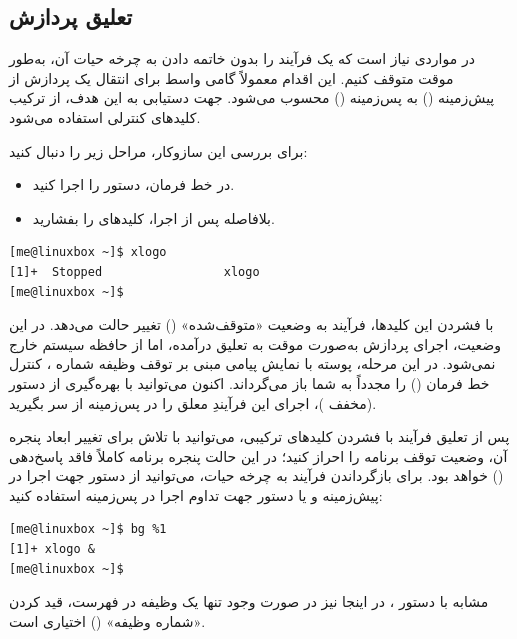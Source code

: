 \subsection{تعلیق پردازش}

در مواردی نیاز است که یک فرآیند را بدون خاتمه دادن به چرخه حیات آن، به‌طور موقت متوقف کنیم. این اقدام معمولاً گامی واسط برای انتقال یک پردازش از پیش‌زمینه () به پس‌زمینه () محسوب می‌شود. جهت دستیابی به این هدف، از ترکیب کلیدهای کنترلی  استفاده می‌شود.

برای بررسی این سازوکار، مراحل زیر را دنبال کنید:

\begin{itemize}
  \item در خط فرمان، دستور  را اجرا کنید.
  \item بلافاصله پس از اجرا، کلیدهای  را بفشارید.
\end{itemize}

\begin{latin}
\begin{lstlisting}
[me@linuxbox ~]$ xlogo
[1]+  Stopped                 xlogo
[me@linuxbox ~]$
\end{lstlisting}
\end{latin}

با فشردن این کلیدها، فرآیند  به وضعیت «متوقف‌شده» () تغییر حالت می‌دهد. در این وضعیت، اجرای پردازش به‌صورت موقت به تعلیق درآمده، اما از حافظه سیستم خارج نمی‌شود. در این مرحله، پوسته با نمایش پیامی مبنی بر توقف وظیفه شماره \cmd{[1]}، کنترل خط فرمان () را مجدداً به شما باز می‌گرداند. اکنون می‌توانید با بهره‌گیری از دستور  (مخفف )، اجرای این فرآیندِ معلق را در پس‌زمینه از سر بگیرید.

پس از تعلیق فرآیند  با فشردن کلیدهای ترکیبی، می‌توانید با تلاش برای تغییر ابعاد پنجره آن، وضعیت توقف برنامه را احراز کنید؛ در این حالت پنجره برنامه کاملاً فاقد پاسخ‌دهی () خواهد بود. برای بازگرداندن فرآیند به چرخه حیات، می‌توانید از دستور  جهت اجرا در پیش‌زمینه و یا دستور  جهت تداوم اجرا در پس‌زمینه استفاده کنید:

\begin{latin}
\begin{lstlisting}
[me@linuxbox ~]$ bg %1
[1]+ xlogo &
[me@linuxbox ~]$
\end{lstlisting}
\end{latin}

مشابه با دستور ، در اینجا نیز در صورت وجود تنها یک وظیفه در فهرست، قید کردن «شماره وظیفه» () اختیاری است.

